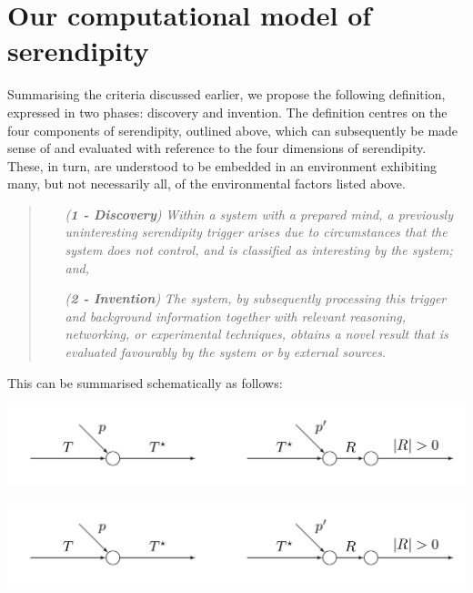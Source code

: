 \section{Our computational model of serendipity} \label{sec:background}

Summarising the criteria discussed earlier, we propose the following
definition, expressed in two phases: discovery and invention.  The
definition centres on the four components of serendipity, outlined
above, which can subsequently be made sense of and evaluated with
reference to the four dimensions of serendipity.  These, in turn, are
understood to be embedded in an environment exhibiting many, but not
necessarily all, of the environmental factors listed above.

\begin{quote}
\begin{enumerate}[itemsep=2pt,labelwidth=9em,leftmargin=6em,rightmargin=2em]
\item[\emph{(\textbf{1 - Discovery})}] \emph{Within a system with a prepared mind, a previously uninteresting serendipity trigger arises due to circumstances that the system does not control, and is classified as interesting by the system; and,}
\item[\emph{(\textbf{2 - Invention})}] \emph{The system, by subsequently processing this trigger and background information together with relevant reasoning, networking, or experimental techniques, obtains a novel result that is evaluated favourably by the system or by external sources.}
\end{enumerate}
\end{quote}

This can be summarised schematically as follows:

% 
{\centering
\includegraphics[width=.8\textwidth]{schematic}
\par}

\includegraphics{figures/schematic/schematic.png}


